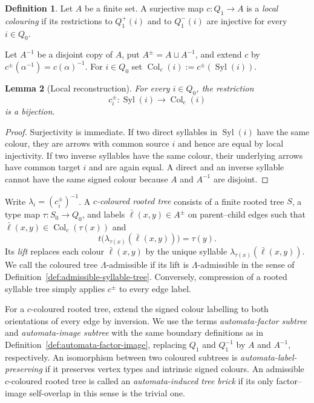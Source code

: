 \documentclass[11pt,a4paper]{amsart}
\newcommand{\Syl}{\operatorname{Syl}}
\theoremstyle{definition}
\newtheorem{definition}{Definition}[section]
\theoremstyle{plain}
\newtheorem{lemma}[definition]{Lemma}
\theoremstyle{remark}
\numberwithin{equation}{section}
\begin{document}
\begin{definition}\label{def:local-colouring}
Let $A$ be a finite set. A surjective map $c:Q_1\to A$ is a \emph{local colouring} if its restrictions to $Q_1^+(i)$ and to $Q_1^-(i)$ are injective for every $i\in Q_0$.
\end{definition}

Let $A^{-1}$ be a disjoint copy of $A$, put $A^{\pm}=A\sqcup A^{-1}$, and extend $c$ by $c^{\pm}(\alpha^{-1})=c(\alpha)^{-1}$. For $i\in Q_0$ set $\operatorname{Col}_c(i):=c^{\pm}(\Syl(i))$.

\begin{lemma}[Local reconstruction]\label{lem:local-reconstruction}
For every $i\in Q_0$, the restriction
\[
c_i^{\pm}:\Syl(i)\longrightarrow\operatorname{Col}_c(i)
\]
is a bijection.
\end{lemma}

\begin{proof}
Surjectivity is immediate. If two direct syllables in $\Syl(i)$ have the same colour, they are arrows with common source $i$ and hence are equal by local injectivity. If two inverse syllables have the same colour, their underlying arrows have common target $i$ and are again equal. A direct and an inverse syllable cannot have the same signed colour because $A$ and $A^{-1}$ are disjoint.
\end{proof}

Write $\lambda_i=(c_i^{\pm})^{-1}$. A \emph{$c$-coloured rooted tree} consists of a finite rooted tree $S$, a type map $\tau:S_0\to Q_0$, and labels $\bar\ell(x,y)\in A^{\pm}$ on parent--child edges such that $\bar\ell(x,y)\in\operatorname{Col}_c(\tau(x))$ and
\[
t\bigl(\lambda_{\tau(x)}(\bar\ell(x,y))\bigr)=\tau(y).
\]
Its \emph{lift} replaces each colour $\bar\ell(x,y)$ by the unique syllable $\lambda_{\tau(x)}(\bar\ell(x,y))$. We call the coloured tree $\Lambda$-admissible if its lift is $\Lambda$-admissible in the sense of Definition~\ref{def:admissible-syllable-tree}. Conversely, compression of a rooted syllable tree simply applies $c^{\pm}$ to every edge label.

For a $c$-coloured rooted tree, extend the signed colour labelling to both orientations of every edge by inversion. We use the terms \emph{automata-factor subtree} and \emph{automata-image subtree} with the same boundary definitions as in Definition~\ref{def:automata-factor-image}, replacing $Q_1$ and $Q_1^{-1}$ by $A$ and $A^{-1}$, respectively. An isomorphism between two coloured subtrees is \emph{automata-label-preserving} if it preserves vertex types and intrinsic signed colours. An admissible $c$-coloured rooted tree is called an \emph{automata-induced tree brick} if its only factor--image self-overlap in this sense is the trivial one.
\end{document}
